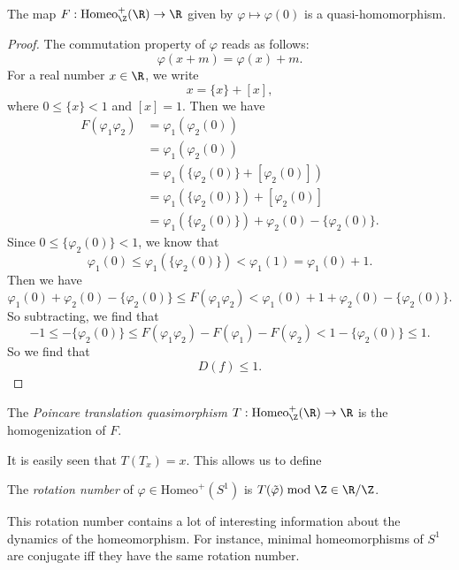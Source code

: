 \documentclass[a4paper]{article}
\newcommand\Homeo{\mathrm{Homeo}}
\begin{document}
\begin{lemma}
  The map $F: \Homeo_\Z^+(\R) \to \R$ given by $\varphi \mapsto \varphi(0)$ is a quasi-homomorphism.
\end{lemma}

\begin{proof}
  The commutation property of $\varphi$ reads as follows:
  \[
    \varphi(x + m) = \varphi(x) + m.
  \]
  For a real number $x \in \R$, we write
  \[
    x = \{x \} + [x],
  \]
  where $0 \leq \{x\} < 1$ and $[x] = 1$. Then we have
  \begin{align*}
    F(\varphi_1 \varphi_2) &= \varphi_1(\varphi_2(0)) \\
    &= \varphi_1(\varphi_2(0))\\
    &= \varphi_1(\{\varphi_2(0)\} + [\varphi_2(0)])\\
    &= \varphi_1(\{\varphi_2(0)\}) + [\varphi_2(0)]\\
    &= \varphi_1(\{\varphi_2(0)\}) + \varphi_2(0) - \{\varphi_2(0)\}.
  \end{align*}
  Since $0 \leq \{\varphi_2(0)\} < 1$, we know that
  \[
    \varphi_1(0) \leq \varphi_1(\{\varphi_2(0)\}) < \varphi_1(1) = \varphi_1(0) + 1.
  \]
  Then we have
  \[
    \varphi_1(0) + \varphi_2(0) - \{\varphi_2(0)\} \leq F(\varphi_1\varphi_2) < \varphi_1(0) + 1 + \varphi_2(0) - \{\varphi_2(0)\}.
  \]
  So subtracting, we find that
  \[
    -1 \leq - \{\varphi_2(0)\} \leq F(\varphi_1 \varphi_2) - F(\varphi_1) - F(\varphi_2) < 1 - \{\varphi_2(0) \} \leq 1.
  \]
  So we find that
  \[
    D(f) \leq 1.
  \]
\end{proof}

\begin{defi}
  The \emph{Poincare translation quasimorphism} $T: \Homeo_\Z^+ (\R) \to \R$ is the homogenization of $F$.
\end{defi}

It is easily seen that $T(T_x) = x$. This allows us to define

\begin{defi}
  The \emph{rotation number}  of $\varphi \in \Homeo^+(S^1)$ is $T(\tilde{\varphi}) \bmod \Z \in \R/\Z$.
\end{defi}
This rotation number contains a lot of interesting information about the dynamics of the homeomorphism. For instance, minimal homeomorphisms of $S^1$ are conjugate iff they have the same rotation number.
\end{document}
